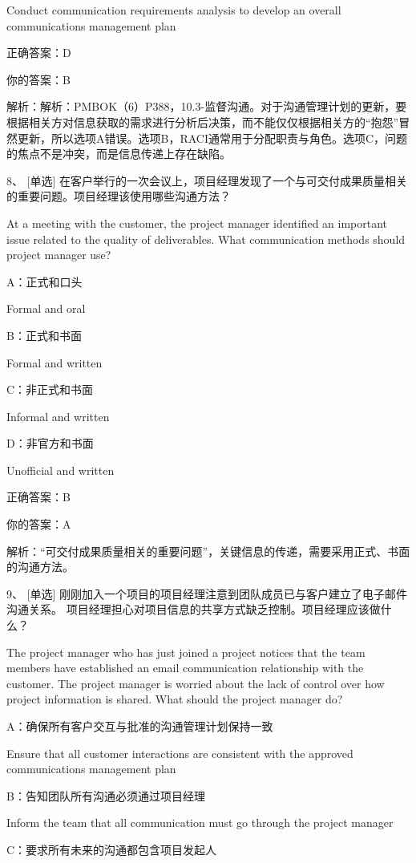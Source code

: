Conduct communication requirements analysis to develop an overall communications management plan

正确答案：D

你的答案：B

解析：解析：PMBOK（6）P388，10.3-监督沟通。对于沟通管理计划的更新，要根据相关方对信息获取的需求进行分析后决策，而不能仅仅根据相关方的“抱怨”冒然更新，所以选项A错误。选项B，RACI通常用于分配职责与角色。选项C，问题的焦点不是冲突，而是信息传递上存在缺陷。


8、 [单选] 在客户举行的一次会议上，项目经理发现了一个与可交付成果质量相关的重要问题。项目经理该使用哪些沟通方法？

At a meeting with the customer, the project manager identified an important issue related to the quality of deliverables. What communication methods should project manager use?

A：正式和口头

Formal and oral

B：正式和书面

Formal and written

C：非正式和书面

Informal and written

D：非官方和书面

Unofficial and written

正确答案：B

你的答案：A

解析：“可交付成果质量相关的重要问题”，关键信息的传递，需要采用正式、书面的沟通方法。


9、 [单选] 刚刚加入一个项目的项目经理注意到团队成员已与客户建立了电子邮件沟通关系。 项目经理担心对项目信息的共享方式缺乏控制。项目经理应该做什么？

The project manager who has just joined a project notices that the team members have established an email communication relationship with the customer. The project manager is worried about the lack of control over how project information is shared. What should the project manager do?

A：确保所有客户交互与批准的沟通管理计划保持一致

Ensure that all customer interactions are consistent with the approved communications management plan

B：告知团队所有沟通必须通过项目经理

Inform the team that all communication must go through the project manager

C：要求所有未来的沟通都包含项目发起人

